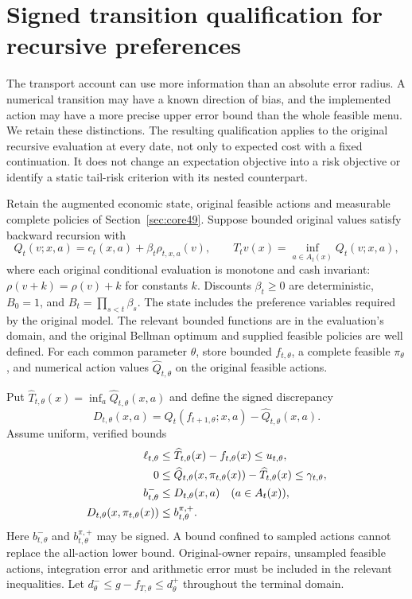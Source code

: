 \section{Signed transition qualification for recursive preferences}\label{sec:risk91}
The transport account can use more information than an absolute error radius. A numerical transition may have a known direction of bias, and the implemented action may have a more precise upper error bound than the whole feasible menu. We retain these distinctions. The resulting qualification applies to the original recursive evaluation at every date, not only to expected cost with a fixed continuation. It does not change an expectation objective into a risk objective or identify a static tail-risk criterion with its nested counterpart.

Retain the augmented economic state, original feasible actions and measurable complete policies of Section~\ref{sec:core49}. Suppose bounded original values satisfy backward recursion with
\[
 Q_t(v;x,a)=c_t(x,a)+\beta_t\rho_{t,x,a}(v),\qquad
 T_tv(x)=\inf_{a\in A_t(x)}Q_t(v;x,a),
\]
where each original conditional evaluation is monotone and cash invariant: $\rho(v+k)=\rho(v)+k$ for constants $k$. Discounts $\beta_t\ge0$ are deterministic, $B_0=1$, and $B_t=\prod_{s<t}\beta_s$. The state includes the preference variables required by the original model. The relevant bounded functions are in the evaluation's domain, and the original Bellman optimum and supplied feasible policies are well defined. For each common parameter $\theta$, store bounded $f_{t,\theta}$, a complete feasible $\pi_\theta$, and numerical action values $\widehat Q_{t,\theta}$ on the original feasible actions.

Put $\widehat T_{t,\theta}(x)=\inf_a\widehat Q_{t,\theta}(x,a)$ and define the signed discrepancy
\[
 D_{t,\theta}(x,a)=Q_t(f_{t+1,\theta};x,a)-\widehat Q_{t,\theta}(x,a).
\]
Assume uniform, verified bounds
\begin{align}\label{eq:signed-input91}
 \ell_{t,\theta}&\le\widehat T_{t,\theta}(x)-f_{t,\theta}(x)
                         \le u_{t,\theta},\notag\\
 0&\le\widehat Q_{t,\theta}(x,\pi_{t,\theta}(x))
                          -\widehat T_{t,\theta}(x)\le\gamma_{t,\theta},\notag\\
 b^-_{t,\theta}&\le D_{t,\theta}(x,a)\quad(a\in A_t(x)),\notag\\
 D_{t,\theta}(x,\pi_{t,\theta}(x))&\le b^{\pi,+}_{t,\theta}.
\end{align}
Here $b^-_{t,\theta}$ and $b^{\pi,+}_{t,\theta}$ may be signed. A bound confined to sampled actions cannot replace the all-action lower bound. Original-owner repairs, unsampled feasible actions, integration error and arithmetic error must be included in the relevant inequalities. Let $d^-_\theta\le g-f_{T,\theta}\le d^+_\theta$ throughout the terminal domain.

